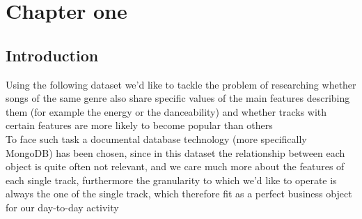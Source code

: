 \documentclass{Configuration_Files/PoliMi3i_thesis}
\begin{document}
\mainmatter %

\chapter{Chapter one}
\label{ch:chapter_one}%

\section{Introduction}
Using the following dataset we'd like to tackle the problem of researching whether songs of the same genre also share specific values of the main features describing them (for example the energy or the danceability) and whether tracks with certain features are more likely to become popular than others\\
To face such task a documental database technology (more specifically MongoDB) has been chosen, since in this dataset the relationship between each object is quite often not relevant, and we care much more about the features of each single track, furthermore the granularity to which we'd like to operate is always the one of the single track, which therefore fit as a perfect business object for our day-to-day activity
\newpage
\end{document}
